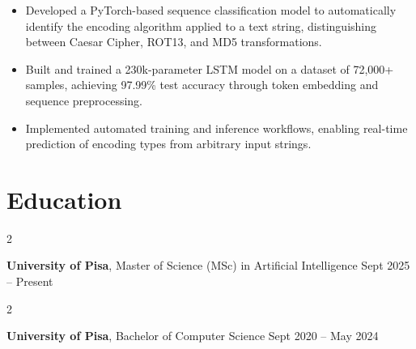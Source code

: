\documentclass[10pt, letterpaper]{article}
\newenvironment{highlights}{
    \begin{itemize}[
        topsep=0.10 cm,
        parsep=0.10 cm,
        partopsep=0pt,
        itemsep=0pt,
        leftmargin=0 cm + 10pt
    ]
}{
    \end{itemize}
} %
\newenvironment{twocolentry}[2][]{
    \onecolentry
    \def\secondColumn{#2}
    \setcolumnwidth{\fill, 4.5 cm}
    \begin{paracol}{2}
}{
    \switchcolumn \raggedleft \secondColumn
    \end{paracol}
    \endonecolentry
} %
\begin{document}
\begin{highlights}
    \item Developed a PyTorch-based sequence classification model to automatically identify the encoding algorithm applied to a text string, distinguishing between Caesar Cipher, ROT13, and MD5 transformations.

    \item Built and trained a 230k-parameter LSTM model on a dataset of 72,000+ samples, achieving 97.99\% test accuracy through token embedding and sequence preprocessing.

    \item Implemented automated training and inference workflows, enabling real-time prediction of encoding types from arbitrary input strings.
\end{highlights}


\section{Education}

\begin{twocolentry}{
        Sept 2025 – Present
    }
    \textbf{University of Pisa}, Master of Science (MSc) in Artificial Intelligence \end{twocolentry}

\vspace{0.10 cm}
\begin{twocolentry}{
        Sept 2020 – May 2024
    }
    \textbf{University of Pisa}, Bachelor of Computer Science\end{twocolentry}
\end{document}
